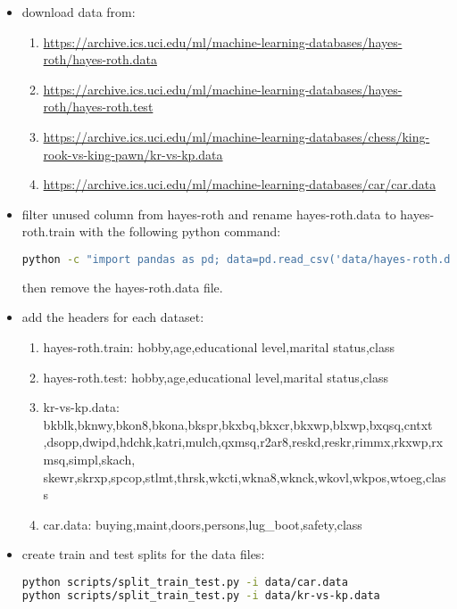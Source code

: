 \begin{itemize}
\begin{lstlisting}[language=bash]
# virtualenv
python3 -m venv venv/
source venv/bin/activate
pip install -r requirements.txt
    \end{lstlisting}
    \item download data from:
    \begin{enumerate}
        \item \url{https://archive.ics.uci.edu/ml/machine-learning-databases/hayes-roth/hayes-roth.data}
        \item \url{https://archive.ics.uci.edu/ml/machine-learning-databases/hayes-roth/hayes-roth.test}
        \item \url{https://archive.ics.uci.edu/ml/machine-learning-databases/chess/king-rook-vs-king-pawn/kr-vs-kp.data}
        \item \url{https://archive.ics.uci.edu/ml/machine-learning-databases/car/car.data}
    \end{enumerate}
    \item filter unused column from hayes-roth and rename hayes-roth.data to hayes-roth.train with the following python command:
    \begin{lstlisting}[language=bash]
python -c "import pandas as pd; data=pd.read_csv('data/hayes-roth.data'); data=data.drop('name', axis=1); data.to_csv('data/hayes-roth.train', index=False)"
    \end{lstlisting}
    then remove the hayes-roth.data file.
    \item add the headers for each dataset:
    \begin{enumerate}
        \item hayes-roth.train: hobby,age,educational level,marital status,class
        \item hayes-roth.test: hobby,age,educational level,marital status,class
        \item kr-vs-kp.data: bkblk,bknwy,bkon8,bkona,bkspr,bkxbq,bkxcr,bkxwp,blxwp,bxqsq,cntxt\\,dsopp,dwipd,hdchk,katri,mulch,qxmsq,r2ar8,reskd,reskr,rimmx,rkxwp,rxmsq,simpl,skach,\\skewr,skrxp,spcop,stlmt,thrsk,wkcti,wkna8,wknck,wkovl,wkpos,wtoeg,class
        \item car.data: buying,maint,doors,persons,lug\_boot,safety,class
    \end{enumerate}
    \item create train and test splits for the data files:
    \begin{lstlisting}[language=bash]
python scripts/split_train_test.py -i data/car.data
python scripts/split_train_test.py -i data/kr-vs-kp.data
    \end{lstlisting}
\end{itemize}

